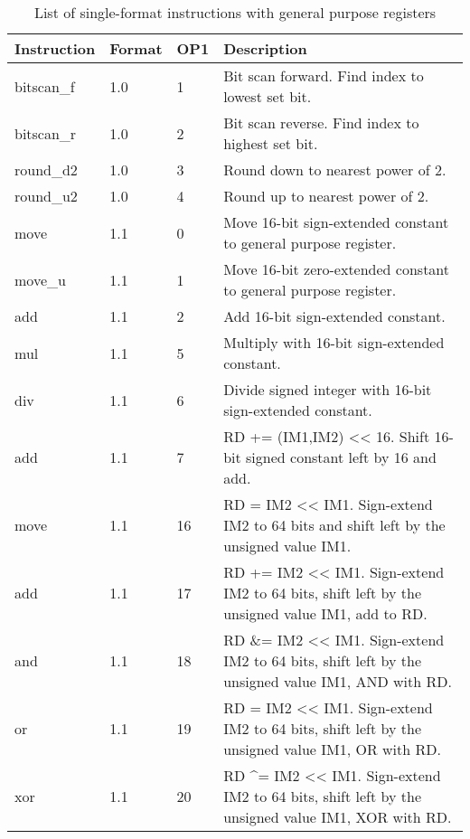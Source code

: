 \documentclass[forwardcom.tex]{subfiles}
\begin{document}
\begin{longtable} {|p{20mm}|p{10mm}|p{8mm}|p{75mm}|}
\caption{List of single-format instructions with general purpose registers} 
\label{table:ListOfSingleFormatInstructionsGP} \\
\endfirsthead
\endhead
\hline
\bfseries Instruction & \bfseries Format &\bfseries OP1 & \bfseries Description \\
\hline
bitscan\_f    & 1.0   &  1 & Bit scan forward. Find index to lowest set bit. \\
bitscan\_r    & 1.0   &  2 & Bit scan reverse. Find index to highest set bit. \\
round\_d2     & 1.0   &  3 & Round down to nearest power of 2. \\
round\_u2     & 1.0   &  4 & Round up to nearest power of 2. \\
move          & 1.1   &  0 & Move 16-bit sign-extended constant to general purpose register. \\
move\_u       & 1.1   &  1 & Move 16-bit zero-extended constant to general purpose register. \\
add           & 1.1   &  2  & Add 16-bit sign-extended constant. \\
mul           & 1.1   &  5  & Multiply with 16-bit sign-extended constant. \\
div           & 1.1   &  6  & Divide signed integer with 16-bit sign-extended constant. \\
add           & 1.1   &  7  & RD += (IM1,IM2) \textless\textless{} 16. Shift 16-bit signed constant left by 16 and add. \\
move          & 1.1   & 16  & RD = IM2 \textless\textless{} IM1. Sign-extend IM2 to 64 bits and shift left by the unsigned value IM1. \\
add           & 1.1   & 17  & RD += IM2 \textless\textless{} IM1. Sign-extend IM2 to 64 bits, shift left by the unsigned value IM1, add to RD. \\
and           & 1.1   & 18  & RD \&= IM2 \textless\textless{} IM1. Sign-extend IM2 to 64 bits, shift left by the unsigned value IM1, AND with RD. \\
or            & 1.1   & 19  & RD \textbar{}= IM2 \textless\textless{} IM1. Sign-extend IM2 to 64 bits, shift left by the unsigned value IM1, OR with RD. \\
xor           & 1.1   & 20  & RD \^{}= IM2 \textless\textless{} IM1. Sign-extend IM2 to 64 bits, shift left by the unsigned value IM1, XOR with RD. \\

\end{longtable}
\end{document}
